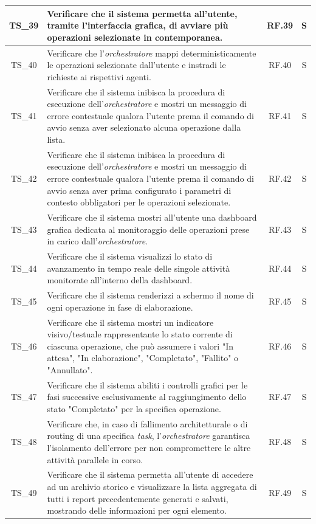 \documentclass[12pt, a4paper]{article}
\newlength{\LargColVal} %
\begin{document}
\begin{xltabular}{\textwidth}{|c|X|C{\LargColVal}|C{\LargColVal}|}
    TS\_39 & Verificare che il sistema permetta all'utente, tramite l'interfaccia grafica, di avviare più operazioni selezionate in contemporanea. & RF.39 & S \\ \hline
    TS\_40 & Verificare che l'\textit{orchestratore} mappi deterministicamente le operazioni selezionate dall'utente e instradi le richieste ai rispettivi agenti. & RF.40 & S \\ \hline
    TS\_41 & Verificare che il sistema inibisca la procedura di esecuzione dell'\textit{orchestratore} e mostri un messaggio di errore contestuale qualora l'utente prema il comando di avvio senza aver selezionato alcuna operazione dalla lista. & RF.41 & S \\ \hline
    TS\_42 & Verificare che il sistema inibisca la procedura di esecuzione dell'\textit{orchestratore} e mostri un messaggio di errore contestuale qualora l'utente prema il comando di avvio senza aver prima configurato i parametri di contesto obbligatori per le operazioni selezionate. & RF.42 & S \\ \hline
    TS\_43 & Verificare che il sistema mostri all'utente una dashboard grafica dedicata al monitoraggio delle operazioni prese in carico dall'\textit{orchestratore}. & RF.43 & S \\ \hline
    TS\_44 & Verificare che il sistema visualizzi lo stato di avanzamento in tempo reale delle singole attività monitorate all'interno della dashboard. & RF.44 & S \\ \hline
    TS\_45 & Verificare che il sistema renderizzi a schermo il nome di ogni operazione in fase di elaborazione. & RF.45 & S \\ \hline
    TS\_46 & Verificare che il sistema mostri un indicatore visivo/testuale rappresentante lo stato corrente di ciascuna operazione, che può assumere i valori "In attesa", "In elaborazione", "Completato", "Fallito" o "Annullato". & RF.46 & S \\ \hline
    TS\_47 & Verificare che il sistema abiliti i controlli grafici per le fasi successive esclusivamente al raggiungimento dello stato "Completato" per la specifica operazione. & RF.47 & S \\ \hline
    TS\_48 & Verificare che, in caso di fallimento architetturale o di routing di una specifica \textit{task}, l'\textit{orchestratore} garantisca l'isolamento dell'errore per non compromettere le altre attività parallele in corso. & RF.48 & S \\ \hline
    TS\_49 & Verificare che il sistema permetta all'utente di accedere ad un archivio storico e visualizzare la lista aggregata di tutti i report precedentemente generati e salvati, mostrando delle informazioni per ogni elemento. & RF.49 & S \\ \hline

\end{xltabular}
\end{document}
